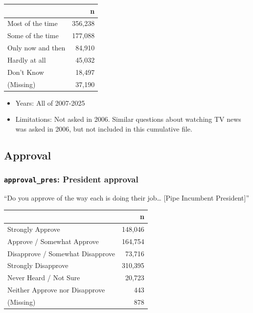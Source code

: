 \documentclass[10pt,article,oneside]{memoir}
\begin{document}
\begin{table}[H]
\centering
\begin{tabular}[t]{lr}
\toprule
 & n\\
\midrule
Most of the time & 356,238\\
Some of the time & 177,088\\
Only now and then & 84,910\\
Hardly at all & 45,032\\
Don't Know & 18,497\\
(Missing) & 37,190\\
\bottomrule
\end{tabular}
\end{table}

\begin{itemize}
\tightlist
\item
  Years: All of 2007-2025
\item
  Limitations: Not asked in 2006. Similar questions about watching TV
  news was asked in 2006, but not included in this cumulative file.
\end{itemize}

\subsection{Approval}\label{approval}

\subsubsection{\texorpdfstring{\texttt{approval\_pres}: President
approval}{approval\_pres: President approval}}\label{approval_pres-president-approval}

``Do you approve of the way each is doing their job\ldots{} {[}Pipe
Incumbent President{]}''

\begin{table}[H]
\centering
\begin{tabular}[t]{lr}
\toprule
 & n\\
\midrule
Strongly Approve & 148,046\\
Approve / Somewhat Approve & 164,754\\
Disapprove / Somewhat Disapprove & 73,716\\
Strongly Disapprove & 310,395\\
Never Heard / Not Sure & 20,723\\
Neither Approve nor Disapprove & 443\\
(Missing) & 878\\
\bottomrule
\end{tabular}
\end{table}
\end{document}
